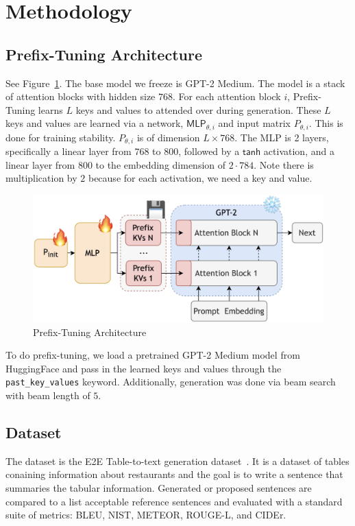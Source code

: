 \documentclass[11pt]{article} %
\begin{document}
\section{Methodology}

\subsection{Prefix-Tuning Architecture}
See Figure~\ref{fig:prefix_tuning}. The base model we freeze is GPT-2 Medium. The model is a stack of attention blocks with hidden size $768$. For each attention block $i$, Prefix-Tuning learns $L$ keys and values to attended over during generation. These $L$ keys and values are learned via a network, $\textsf{MLP}_{\theta,i}$ and input matrix $P_{\theta,i}$. This is done for training stability. $P_{\theta,i}$ is of dimension $L\times 768$. The MLP is 2 layers, specifically a linear layer from $768$ to $800$, followed by a $\textsf{tanh}$ activation, and a linear layer from $800$ to the embedding dimension of $2\cdot 784$. Note there is multiplication by $2$ because for each activation, we need a key and value.
\begin{figure}
    \centering
    \includegraphics[width=0.75\linewidth]{prefix-architecture.png}
    \caption{Prefix-Tuning Architecture}
    \label{fig:prefix_tuning}
\end{figure}

To do prefix-tuning, we load a pretrained GPT-2 Medium model from HuggingFace and pass in the learned keys and values through the \verb|past_key_values| keyword. Additionally, generation was done via beam search with beam length of $5$.

\subsection{Dataset}
The dataset is the E2E Table-to-text generation dataset~\cite{novikova-etal-2017-e2e}. It is a dataset of tables conaining information about restaurants and the goal is to write a sentence that summaries the tabular information. Generated or proposed sentences are compared to a list acceptable reference sentences and evaluated with a standard suite of metrics: BLEU, NIST, METEOR, ROUGE-L, and CIDEr.
\end{document}
